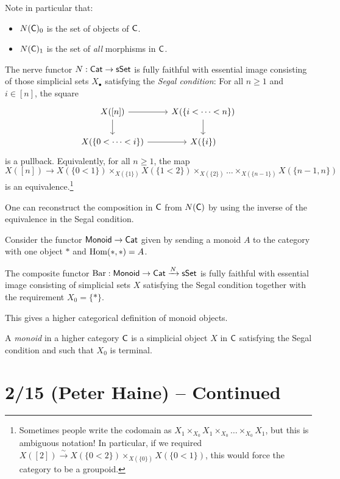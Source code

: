 \documentclass{article}
\begin{document}
Note in particular that:
\begin{itemize}
	\item $N(\mathsf{C})_0$ is the set of objects of $\mathsf{C}$.
	\item $N(\mathsf{C})_1$ is the set of \emph{all} morphisms in $\mathsf{C}$.
\end{itemize}

\begin{thm}[Grothendieck]
	The nerve functor $N: \mathsf{Cat} \to \mathsf{sSet}$ is fully faithful with essential image consisting of those simplicial sets $X_\bullet$ satisfying the \emph{Segal condition}:
	For all $n \geq 1$ and $i \in [n]$, the square
	\[
		\begin{tikzcd}
			X([n]) \rar \dar & X(\{i < \dots < n \}) \dar \\
			X(\{ 0 < \dots < i \}) \rar & X(\{ i \})
		\end{tikzcd}
	\]
	is a pullback.
	Equivalently, for all $n \geq 1$, the map $X([n]) \to X(\{0 < 1\}) \times_{X(\{1\})} X(\{1 < 2\}) \times_{X(\{2\})} \dots \times_{X(\{n-1\})} X(\{n-1,n\})$ is an equivalence.\footnote{
		Sometimes people write the codomain as $X_1 \times_{X_0} X_1 \times_{X_0} \dots \times_{X_0} X_1$, but this is ambiguous notation!
		In particular, if we required $X([2]) \xrightarrow{\sim} X(\{0 < 2\}) \times_{X(\{0\})} X(\{0 < 1\})$, this would force the category to be a groupoid.}
\end{thm}

One can reconstruct the composition in $\mathsf{C}$ from $N(\mathsf{C})$ by using the inverse of the equivalence in the Segal condition.

Consider the functor $\mathsf{Monoid} \to \mathsf{Cat}$ given by sending a monoid $A$ to the category with one object $*$ and $\operatorname{Hom}(*, *) = A$.

\begin{cor}[Milnor]
	The composite functor $\operatorname{Bar}: \mathsf{Monoid} \to \mathsf{Cat} \xrightarrow{N} \mathsf{sSet}$ is fully faithful with essential image consisting of simplicial sets $X$ satisfying the Segal condition together with the requirement $X_0 = \{ * \}$.
\end{cor}

This gives a higher categorical definition of monoid objects.

\begin{dfn}
	A \emph{monoid} in a higher category $\mathsf{C}$ is a simplicial object $X$ in $\mathsf{C}$ satisfying the Segal condition and such that $X_0$ is terminal.
\end{dfn}

\section{2/15 (Peter Haine) -- Continued}
\end{document}
